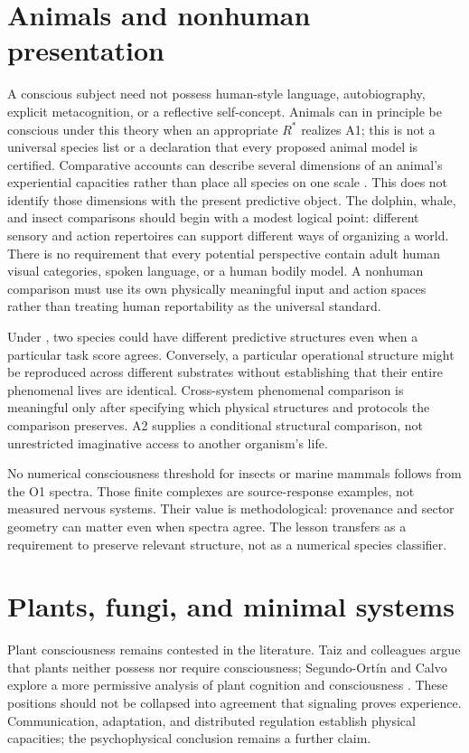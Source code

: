 \section{Animals and nonhuman presentation}\label{section:comparative:animals-and-nonhuman-presentation}
A conscious subject need not possess human-style language, autobiography, explicit metacognition, or a reflective self-concept. Animals can in principle be conscious under this theory when an appropriate $R^\ast$ realizes A1; this is not a universal species list or a declaration that every proposed animal model is certified. Comparative accounts can describe several dimensions of an animal's experiential capacities rather than place all species on one scale \cite{Birch2020}. This does not identify those dimensions with the present predictive object. The dolphin, whale, and insect comparisons should begin with a modest logical point: different sensory and action repertoires can support different ways of organizing a world. There is no requirement that every potential perspective contain adult human visual categories, spoken language, or a human bodily model. A nonhuman comparison must use its own physically meaningful input and action spaces rather than treating human reportability as the universal standard.

Under \spctwo, two species could have different predictive structures even when a particular task score agrees. Conversely, a particular operational structure might be reproduced across different substrates without establishing that their entire phenomenal lives are identical. Cross-system phenomenal comparison is meaningful only after specifying which physical structures and protocols the comparison preserves. A2 supplies a conditional structural comparison, not unrestricted imaginative access to another organism's life.

No numerical consciousness threshold for insects or marine mammals follows from the O1 spectra. Those finite complexes are source-response examples, not measured nervous systems. Their value is methodological: provenance and sector geometry can matter even when spectra agree. The lesson transfers as a requirement to preserve relevant structure, not as a numerical species classifier.

\section{Plants, fungi, and minimal systems}\label{section:comparative:plants-fungi-and-minimal-systems}
Plant consciousness remains contested in the literature. Taiz and colleagues argue that plants neither possess nor require consciousness; Segundo-Ort{\'i}n and Calvo explore a more permissive analysis of plant cognition and consciousness \cite{Taiz2019,Segundo2022}. These positions should not be collapsed into agreement that signaling proves experience. Communication, adaptation, and distributed regulation establish physical capacities; the psychophysical conclusion remains a further claim.


